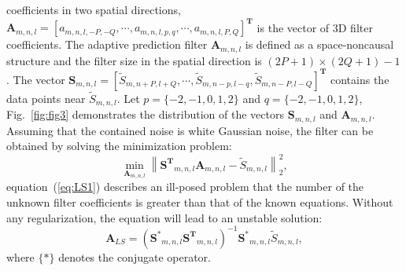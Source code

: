 coefficients in two spatial directions,
$\mathbf{A}_{m,n,l}=[a_{m,n,l,-P,-Q}, \cdots, a_{m,n,l,p,q}, \cdots,
a_{m,n,l,P,Q}]^{\mathbf{T}} $ is the vector of 3D filter
coefficients. The adaptive prediction filter $\mathbf{A}_{m,n,l}$ is
defined as a space-noncausal structure and the filter size in the
spatial direction is $(2P+1)\times(2Q+1)-1$. The vector $
\mathbf{S}_{m,n,l}= [\tilde{S}_{m,n+P,l+Q}, \cdots,
\tilde{S}_{m,n-p,l-q}, \tilde{S}_{m,n-P,l-Q}]^{\mathbf{T}} $ contains
the data points near $\tilde{S}_{m,n,l}$.  Let $p=\{-2,-1,0,1,2\}$ and
$q=\{-2,-1,0,1,2\}$, Fig.~\ref{fig:fig3} demonstrates the distribution
of the vectors $\mathbf{S}_{m,n,l}$ and $\mathbf{A}_{m,n,l}$. Assuming
that the contained noise is white Gaussian noise, the filter can be
obtained by solving the minimization problem:
\begin{equation}
    \label{eq:LS1}
    \min_{\mathbf{A}_{m,n,l}} \left \| \mathbf{S^{T}}_{m,n,l}
    \mathbf{A}_{m,n,l} - \tilde{S}_{m,n,l} \right \| _{2}^{2},
\end{equation}
equation~(\ref{eq:LS1}) describes an ill-posed problem that the number
of the unknown filter coefficients is greater than that of the known
equations. Without any regularization, the equation will lead to an
unstable solution:
\begin{equation}
    \label{eq:solution1}
    \mathbf{A}_{LS}=(\mathbf{S^{*}}_{m,n,l} \mathbf{S^{T}}_{m,n,l})^{-1}
    \mathbf{S^{*}}_{m,n,l} \tilde{S}_{m,n,l},
\end{equation}
where $\{ * \}$ denotes the conjugate operator.

